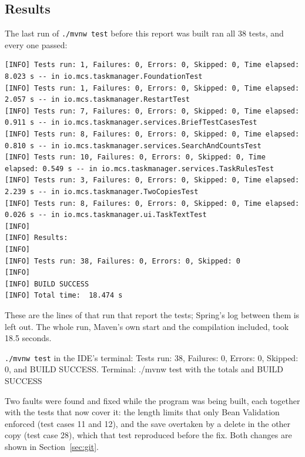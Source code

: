 \subsection{Results}

The last run of \texttt{./mvnw test} before this report was built ran all 38 tests, and every one passed:
\begin{lstlisting}[style=terminal]
[INFO] Tests run: 1, Failures: 0, Errors: 0, Skipped: 0, Time elapsed: 8.023 s -- in io.mcs.taskmanager.FoundationTest
[INFO] Tests run: 1, Failures: 0, Errors: 0, Skipped: 0, Time elapsed: 2.057 s -- in io.mcs.taskmanager.RestartTest
[INFO] Tests run: 7, Failures: 0, Errors: 0, Skipped: 0, Time elapsed: 0.911 s -- in io.mcs.taskmanager.services.BriefTestCasesTest
[INFO] Tests run: 8, Failures: 0, Errors: 0, Skipped: 0, Time elapsed: 0.810 s -- in io.mcs.taskmanager.services.SearchAndCountsTest
[INFO] Tests run: 10, Failures: 0, Errors: 0, Skipped: 0, Time elapsed: 0.549 s -- in io.mcs.taskmanager.services.TaskRulesTest
[INFO] Tests run: 3, Failures: 0, Errors: 0, Skipped: 0, Time elapsed: 2.239 s -- in io.mcs.taskmanager.TwoCopiesTest
[INFO] Tests run: 8, Failures: 0, Errors: 0, Skipped: 0, Time elapsed: 0.026 s -- in io.mcs.taskmanager.ui.TaskTextTest
[INFO]
[INFO] Results:
[INFO]
[INFO] Tests run: 38, Failures: 0, Errors: 0, Skipped: 0
[INFO]
[INFO] BUILD SUCCESS
[INFO] Total time:  18.474 s
\end{lstlisting}
These are the lines of that run that report the tests; Spring's log between them is left out. The whole run, Maven's
own start and the compilation included, took 18.5 seconds.

  {\texttt{./mvnw test} in the IDE's terminal: Tests run: 38, Failures: 0, Errors: 0, Skipped: 0, and BUILD SUCCESS.}
  {Terminal: ./mvnw test with the totals and BUILD SUCCESS}

Two faults were found and fixed while the program was being built, each together with the tests that now cover it:
the length limits that only Bean Validation enforced (test cases 11 and 12), and the save overtaken by a delete in
the other copy (test case 28), which that test reproduced before the fix. Both changes are shown in
Section~\ref{sec:git}.
